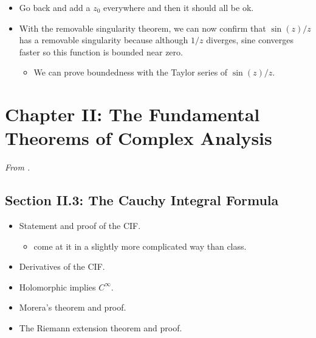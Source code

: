 \documentclass[../notes.tex]{subfiles}
\begin{document}
\begin{itemize}
\begin{proof}
        Morera then tells us that $F\in\mO(U)$, so $F'=f\in\mO(U)$. Note that $F'=f$ because
        \begin{equation*}
            F'(z) = \lim_{\zeta\to z}\frac{F(\zeta)-F(z)}{\zeta-z}
            = \lim_{\zeta\to z}\frac{f(\zeta)(\zeta-z)-0}{\zeta-z}
            = \lim_{\zeta\to z}f(\zeta)
            = f(z)
        \end{equation*}
    \end{proof}
    \item Go back and add a $z_0$ everywhere and then it should all be ok.
    \item With the removable singularity theorem, we can now confirm that $\sin(z)/z$ has a removable singularity because although $1/z$ diverges, sine converges faster so this function is bounded near zero.
    \begin{itemize}
        \item We can prove boundedness with the Taylor series of $\sin(z)/z$.
    \end{itemize}
\end{itemize}



\section{Chapter II: The Fundamental Theorems of Complex Analysis}
\emph{From \textcite{bib:FischerLieb}.}
\subsection*{Section II.3: The Cauchy Integral Formula}
\begin{itemize}
    \item {}Statement and proof of the CIF.
    \begin{itemize}
        \item \textcite{bib:FischerLieb} come at it in a slightly more complicated way than class.
    \end{itemize}
    \item Derivatives of the CIF.
    \item Holomorphic implies $C^\infty$.
    \item Morera's theorem and proof.
    \item The Riemann extension theorem and proof.
\end{itemize}
\end{document}
